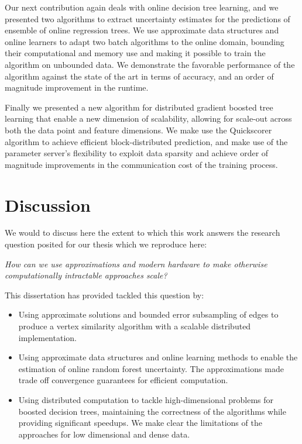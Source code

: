 Our next contribution again deals with online decision tree learning,
and we presented two algorithms to extract uncertainty estimates
for the predictions of ensemble of online regression trees.
We use approximate data structures and online learners to
adapt two batch algorithms to the online domain, bounding
their computational and memory use and making it possible
to train the algorithm on unbounded data. We demonstrate the
favorable performance of the algorithm against the state of
the art in terms of accuracy, and an order of magnitude improvement
in the runtime.

Finally we presented a new algorithm for distributed gradient boosted tree
learning that enable a new dimension of scalability, allowing for scale-out
across both the data point and feature dimensions. We make use the Quickscorer
algorithm to achieve efficient block-distributed prediction, and make use
of the parameter server's flexibility to exploit data sparsity and achieve
order of magnitude improvements in the communication cost of the training process.

\section{Discussion}

We would to discuss here the extent to which this work answers the research
question posited for our thesis which we reproduce here:

\begin{displayquote}
	\emph{How can we use approximations and modern hardware to make otherwise computationally intractable approaches scale?}
\end{displayquote}

\noindent
This dissertation has provided tackled this question by:
\begin{itemize}
	\item Using approximate solutions and bounded error subsampling of edges
	to produce a vertex similarity algorithm with a scalable
	distributed implementation.

	\item Using approximate data structures and online learning methods
	to enable the estimation of online random forest uncertainty. The approximations
	made trade off convergence guarantees for efficient computation.

	\item Using distributed computation to tackle high-dimensional problems
	for boosted decision trees, maintaining the correctness of the algorithms
	while providing significant speedups. We make clear the limitations
	of the approaches for low dimensional and dense data.
\end{itemize}


